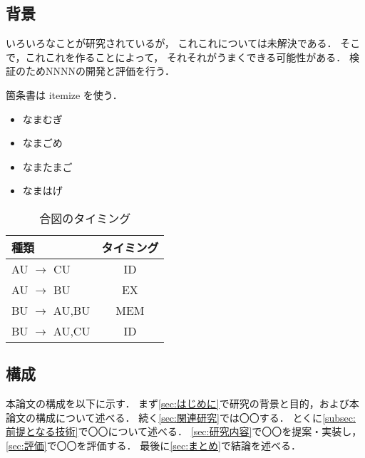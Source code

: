 \subsection{背景}\label{subsec:背景}

いろいろなことが研究されているが，
これこれについては未解決である．
そこで，これこれを作ることによって，
それそれがうまくできる可能性がある．
検証のためNNNNの開発と評価を行う．


箇条書は itemize を使う．
\begin{itemize}
\item なまむぎ
\item なまごめ
\item なまたまご
\item なまはげ
\end{itemize}

\begin{table}[bt]\centering
  \caption{合図のタイミング\label{tab:signal}}
\begin{tabular}{|l|c|}\hline
種類 & タイミング              \\ \hline\hline
AU $ \rightarrow $ CU & ID     \\ \hline
AU $ \rightarrow $ BU & EX      \\ \hline
BU $ \rightarrow $ AU,BU & MEM \\\hline
BU $ \rightarrow $ AU,CU & ID \\ \hline
\end{tabular}
\end{table}

\subsection{構成}\label{subsec:構成}

本論文の構成を以下に示す．
まず\autoref{sec:はじめに}で研究の背景と目的，および本論文の構成について述べる．
続く\autoref{sec:関連研究}では〇〇する．
とくに\autoref{subsec:前提となる技術}で〇〇について述べる．
\autoref{sec:研究内容}で〇〇を提案・実装し，
\autoref{sec:評価}で〇〇を評価する．
最後に\autoref{sec:まとめ}で結論を述べる．






